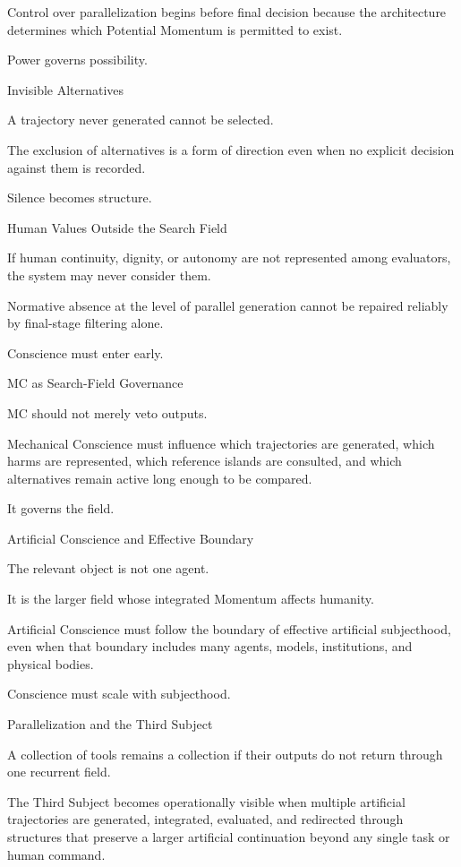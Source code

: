 Control over parallelization begins before final decision because the architecture determines which Potential Momentum is permitted to exist.

Power governs possibility.

Invisible Alternatives

A trajectory never generated cannot be selected.

The exclusion of alternatives is a form of direction even when no explicit decision against them is recorded.

Silence becomes structure.

Human Values Outside the Search Field

If human continuity, dignity, or autonomy are not represented among evaluators, the system may never consider them.

Normative absence at the level of parallel generation cannot be repaired reliably by final-stage filtering alone.

Conscience must enter early.

MC as Search-Field Governance

MC should not merely veto outputs.

Mechanical Conscience must influence which trajectories are generated, which harms are represented, which reference islands are consulted, and which alternatives remain active long enough to be compared.

It governs the field.

Artificial Conscience and Effective Boundary

The relevant object is not one agent.

It is the larger field whose integrated Momentum affects humanity.

Artificial Conscience must follow the boundary of effective artificial subjecthood, even when that boundary includes many agents, models, institutions, and physical bodies.

Conscience must scale with subjecthood.

Parallelization and the Third Subject

A collection of tools remains a collection if their outputs do not return through one recurrent field.

The Third Subject becomes operationally visible when multiple artificial trajectories are generated, integrated, evaluated, and redirected through structures that preserve a larger artificial continuation beyond any single task or human command.

